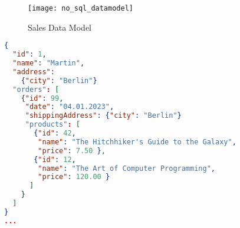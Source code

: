 \begin{figure}[H]
	\centering
	\texttt{[image: no\_sql\_datamodel]}
	\caption[Sales Data Model]{Sales Data Model }
	\label{fig:NoSQLDataModel}
\end{figure}

\begin{lstlisting}[language=JSON, caption=JSON Document, captionpos=b, label=lst:JSONDocument]
{
  "id": 1,
  "name": "Martin",
  "address": 
    {"city": "Berlin"}
  "orders": [
    {"id": 99,
     "date": "04.01.2023",
     "shippingAddress": {"city": "Berlin"}
     "products": [
       {"id": 42,
        "name": "The Hitchhiker's Guide to the Galaxy",
        "price": 7.50 },
       {"id": 12,
        "name": "The Art of Computer Programming",
        "price": 120.00 }
      ]
    }
  ]
}
...
\end{lstlisting}


